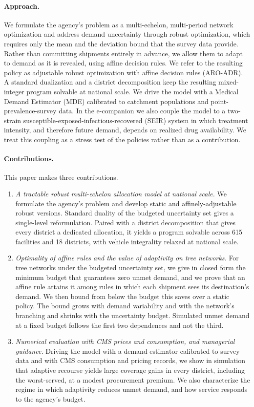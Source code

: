 \documentclass[11pt]{article}
\begin{document}
\paragraph{Approach.}
We formulate the agency's problem as a multi-echelon, multi-period network optimization and address demand uncertainty through robust optimization, which requires only the mean and the deviation bound that the survey data provide.
Rather than committing shipments entirely in advance, we allow them to adapt to demand as it is revealed, using affine decision rules.
We refer to the resulting policy as adjustable robust optimization with affine decision rules (ARO-ADR).
A standard dualization and a district decomposition keep the resulting mixed-integer program solvable at national scale.
We drive the model with a Medical Demand Estimator (MDE) calibrated to catchment populations and point-prevalence-survey data.
In the e-companion we also couple the model to a two-strain susceptible-exposed-infectious-recovered (SEIR) system in which treatment intensity, and therefore future demand, depends on realized drug availability.
We treat this coupling as a stress test of the policies rather than as a contribution.

\paragraph{Contributions.}
This paper makes three contributions.
\begin{enumerate}
\item \emph{A tractable robust multi-echelon allocation model at national scale.} We formulate the agency's problem and develop static and affinely-adjustable robust versions. Standard duality of the budgeted uncertainty set gives a single-level reformulation. Paired with a district decomposition that gives every district a dedicated allocation, it yields a program solvable across 615 facilities and 18 districts, with vehicle integrality relaxed at national scale.
\item \emph{Optimality of affine rules and the value of adaptivity on tree networks.} For tree networks under the budgeted uncertainty set, we give in closed form the minimum budget that guarantees zero unmet demand, and we prove that an affine rule attains it among rules in which each shipment sees its destination's demand. We then bound from below the budget this saves over a static policy. The bound grows with demand variability and with the network's branching and shrinks with the uncertainty budget. Simulated unmet demand at a fixed budget follows the first two dependences and not the third.
\item \emph{Numerical evaluation with CMS prices and consumption, and managerial guidance.} Driving the model with a demand estimator calibrated to survey data and with CMS consumption and pricing records, we show in simulation that adaptive recourse yields large coverage gains in every district, including the worst-served, at a modest procurement premium. We also characterize the regime in which adaptivity reduces unmet demand, and how service responds to the agency's budget.
\end{enumerate}
\end{document}
